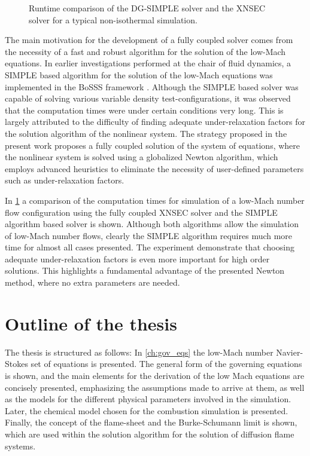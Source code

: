 \begin{figure}[t]	
	\centering
	\caption{Runtime comparison of the DG-SIMPLE solver and the XNSEC solver for a typical non-isothermal simulation.}
	\label{fig:RuntimeComparisonk2}
\end{figure}
The main motivation for the development of a fully coupled solver comes from the necessity of a fast and robust algorithm for the solution of the low-Mach equations. In earlier investigations performed at the chair of fluid dynamics, a SIMPLE based algorithm for the solution of the low-Mach equations was implemented in the \gls{BoSSS} framework \parencite{kleinSIMPLEBasedDiscontinuous2013,kleinExtensionSIMPLEBased2015,kleinHighorderDiscontinuousGalerkin2016}. Although the SIMPLE based solver was capable of solving various variable density test-configurations, it was observed that the computation times were under certain conditions very long. This is largely attributed to the difficulty of finding adequate under-relaxation factors for the solution algorithm of the nonlinear system. The strategy proposed in the present work proposes a fully coupled solution of the system of equations, where the nonlinear system is solved using a globalized Newton algorithm, which employs advanced heuristics to eliminate the necessity of user-defined parameters such as under-relaxation factors.

In \cref{fig:RuntimeComparisonk2} a comparison of the computation times for simulation of a low-Mach number flow configuration using the fully coupled \gls{XNSEC} solver and the SIMPLE algorithm based solver is shown. Although both algorithms allow the simulation of low-Mach number flows, clearly the SIMPLE algorithm requires much more time for almost all cases presented. The experiment demonstrate that choosing adequate under-relaxation factors is even more important for high order solutions. This highlights a fundamental advantage of the presented Newton method, where no extra parameters are needed. 
\section{Outline of the thesis}

The thesis is structured as follows: In \cref{ch:gov_eqs} the low-Mach number Navier-Stokes set of equations is presented. The general form of the governing equations is shown, and the main elements for the derivation of the low Mach equations are concisely presented, emphasizing the assumptions made to arrive at them, as well as the models for the different physical parameters involved in the simulation. Later, the chemical model chosen for the combustion simulation is presented. Finally, the concept of the flame-sheet and the Burke-Schumann limit is shown, which are used within the solution algorithm for the solution of diffusion flame systems.

